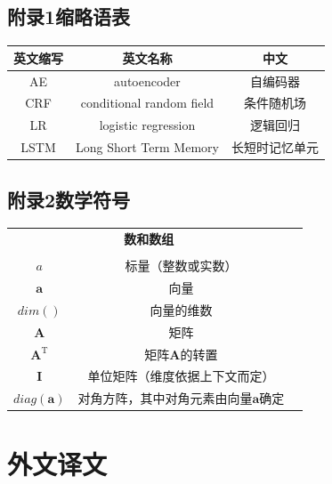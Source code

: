 \documentclass[a4paper,AutoFakeBold,oneside,12pt]{book}
\begin{document}
\section*{附录1\quad{}缩略语表}
\begin{center}
	\begin{tabular}{ccc}
		\textbf{英文缩写} & \textbf{英文名称} & \textbf{中文} \\
		\hline
		AE & autoencoder & 自编码器\\
		CRF & conditional random field & 条件随机场\\
		LR & logistic regression & 逻辑回归\\
		LSTM & Long Short Term Memory & 长短时记忆单元 \\
	\end{tabular}
\end{center}

{}
\section*{附录2\quad{}数学符号}
\begin{center}
	\begin{tabular}{ccc}
		\multicolumn{2}{c}{\textbf{数和数组}} \\
		\\
		$a$ & 标量（整数或实数）\\
		$\bm{a}$ & 向量\\
		$dim()$ & 向量的维数\\
		$\bm{A}$ & 矩阵\\
		$\bm{A}^\mathrm{T}$ & 矩阵$\textbf{A}$的转置\\
		$\bm{I}$ & 单位矩阵（维度依据上下文而定） \\
 		$diag(\bm{a})$ & 对角方阵，其中对角元素由向量$\bm{a}$确定 \\

	\end{tabular}
\end{center}

\newpage\backmatter
\chapter*{外\quad{}文\quad{}译\quad{}文}
\vspace{8mm}

\thispagestyle{empty}

\begin{center}
\sihao{}

\xiaosihao{}

\xiaosihao{}
\end{center}
\end{document}
